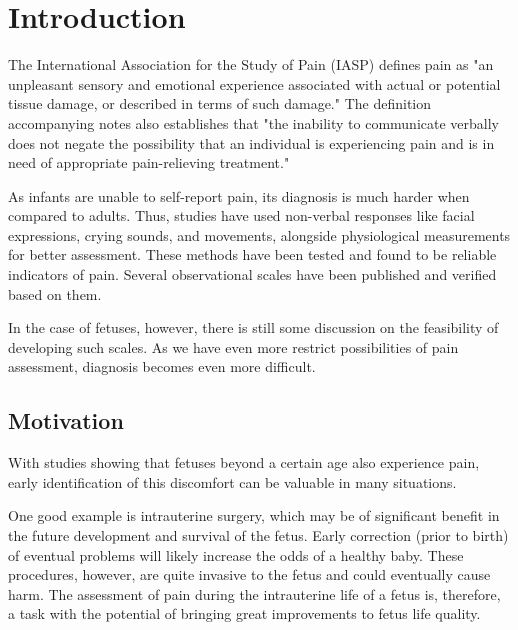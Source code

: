 \documentclass[msc]{ppgccufmg}
\begin{document}

\chapter{Introduction}

The International Association for the Study of Pain (IASP) defines pain as "an unpleasant sensory and emotional experience associated with actual or potential tissue damage, or described in terms of such damage." \cite{merskey1994classification} The definition accompanying notes also establishes that "the inability to communicate verbally does not negate the possibility that an individual is experiencing pain and is in need of appropriate pain-relieving treatment."

As infants are unable to self-report pain, its diagnosis is much harder when compared to adults. Thus, studies have used non-verbal responses like facial expressions, crying sounds, and movements, alongside physiological measurements for better assessment. These methods have been tested and found to be reliable indicators of pain. Several observational scales have been published and verified based on them.

In the case of fetuses, however, there is still some discussion on the feasibility of developing such scales. As we have even more restrict possibilities of pain assessment, diagnosis becomes even more difficult.

\section{Motivation}

With studies showing that fetuses beyond a certain age also experience pain, early identification of this discomfort can be valuable in many situations.

One good example is intrauterine surgery, which may be of significant benefit in the future development and survival of the fetus. Early correction (prior to birth) of eventual problems will likely increase the odds of a healthy baby. These procedures, however, are quite invasive to the fetus and could eventually cause harm. The assessment of pain during the intrauterine life of a fetus is, therefore, a task with the potential of bringing great improvements to fetus life quality.
\end{document}
